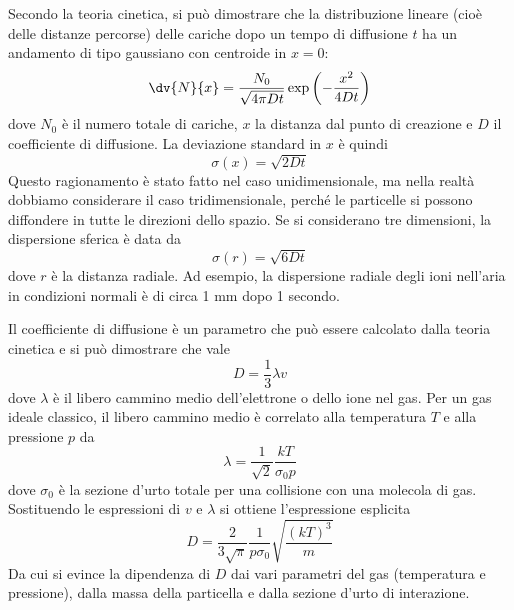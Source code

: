 Secondo la teoria cinetica, si può dimostrare che la distribuzione lineare (cioè delle distanze percorse) delle cariche dopo un tempo di diffusione $t$ ha un andamento di tipo gaussiano con centroide in $x=0$:
\begin{equation*}
   \dv{N}{x}=\frac{N_0}{\sqrt{4\pi D t}} \exp\left(-\frac{x^2}{4Dt}\right)
\end{equation*}
dove $N_0$ è il numero totale di cariche, $x$ la distanza dal punto di creazione e $D$ il coefficiente di diffusione. La deviazione standard in $x$ è quindi
\begin{equation*}
   \sigma(x) = \sqrt{2Dt}
\end{equation*}
Questo ragionamento è stato fatto nel caso unidimensionale, ma nella realtà dobbiamo considerare il caso tridimensionale, perché le particelle si possono diffondere in tutte le direzioni dello spazio. Se si considerano tre dimensioni, la dispersione sferica è data da
\begin{equation*}
   \sigma(r)=\sqrt{6Dt}
\end{equation*}
dove $r$ è la distanza radiale. Ad esempio, la dispersione radiale degli ioni nell'aria in condizioni normali è di circa 1 mm dopo 1 secondo.

Il coefficiente di diffusione è un parametro che può essere calcolato dalla teoria cinetica e si può dimostrare che vale
\begin{equation*}
   D=\frac{1}{3} \lambda v
\end{equation*}
dove $\lambda$ è il libero cammino medio dell'elettrone o dello ione nel gas. Per un gas ideale classico, il libero cammino medio è correlato alla temperatura $T$ e alla pressione $p$ da
\begin{equation*}
   \lambda=\frac{1}{\sqrt{2}} \frac{kT}{\sigma_0 p}
\end{equation*}
dove $\sigma_0$ è la sezione d'urto totale per una collisione con una molecola di gas. Sostituendo le espressioni di $v$ e $\lambda$ si ottiene l'espressione esplicita
\begin{equation*}
   D=\frac{2}{3\sqrt{\pi}} \frac{1}{p\sigma_0} \sqrt{\frac{(kT)^3}{m}}
\end{equation*}
Da cui si evince la dipendenza di $D$ dai vari parametri del gas (temperatura e pressione), dalla massa della particella e dalla sezione d'urto di interazione.


